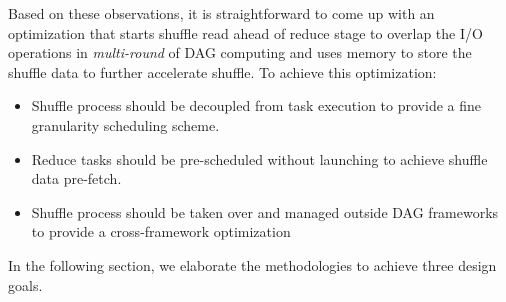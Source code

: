 Based on these observations, it is straightforward to come up with an optimization that starts shuffle read ahead of reduce stage to overlap the I/O operations in \textit{multi-round} of DAG computing and uses memory to store the shuffle data to further accelerate shuffle. To achieve this optimization:
\begin{itemize}
	\item Shuffle process should be decoupled from task execution to provide a fine granularity scheduling scheme.
	\item Reduce tasks should be pre-scheduled without launching to achieve shuffle data pre-fetch.
	\item Shuffle process should be taken over and managed outside DAG frameworks to provide a cross-framework optimization
\end{itemize}
In the following section, we elaborate the methodologies to achieve three design goals.
